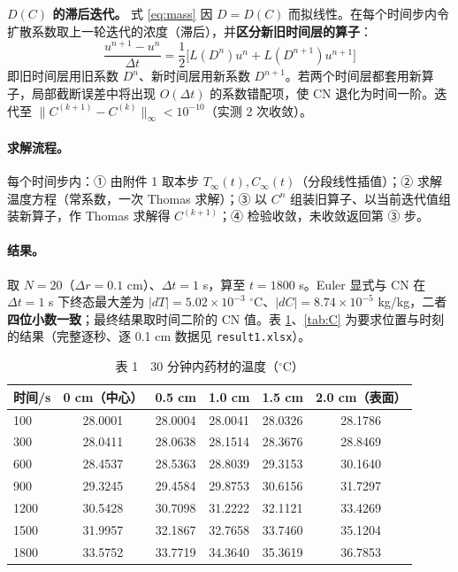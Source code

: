 \documentclass[12pt,a4paper]{ctexart}
\begin{document}
\textbf{$D(C)$ 的滞后迭代。} 式 \eqref{eq:mass} 因 $D=D(C)$ 而拟线性。在每个时间步内令扩散系数取上一轮迭代的浓度（滞后），并\textbf{区分新旧时间层的算子}：
\begin{equation}
\frac{u^{n+1}-u^{n}}{\Delta t}
=\frac12\Big[L(D^n)u^{n}+L(D^{n+1})u^{n+1}\Big]
\label{eq:cn_varc}
\end{equation}
即旧时间层用旧系数 $D^n$、新时间层用新系数 $D^{n+1}$。若两个时间层都套用新算子，局部截断误差中将出现 $O(\Delta t)$ 的系数错配项，使 CN 退化为时间一阶。迭代至 $\|C^{(k+1)}-C^{(k)}\|_\infty<10^{-10}$（实测 2 次收敛）。

\paragraph{求解流程。} 每个时间步内：① 由附件 1 取本步 $T_\infty(t),C_\infty(t)$（分段线性插值）；② 求解温度方程（常系数，一次 Thomas 求解）；③ 以 $C^n$ 组装旧算子、以当前迭代值组装新算子，作 Thomas 求解得 $C^{(k+1)}$；④ 检验收敛，未收敛返回第 ③ 步。

\paragraph{结果。} 取 $N=20$（$\Delta r=0.1$ cm）、$\Delta t=1$ s，算至 $t=1800$ s。Euler 显式与 CN 在 $\Delta t=1$ s 下终态最大差为 $|dT|=5.02\times10^{-3}$ $^\circ$C、$|dC|=8.74\times10^{-5}$ kg/kg，二者\textbf{四位小数一致}；最终结果取时间二阶的 CN 值。表 \ref{tab:T}、\ref{tab:C} 为要求位置与时刻的结果（完整逐秒、逐 0.1 cm 数据见 \texttt{result1.xlsx}）。

\begin{table}[H]
\centering
\caption{表 1　30 分钟内药材的温度（$^\circ$C）}
\label{tab:T}
\begin{tabular}{lccccc}
\toprule
时间/s & 0 cm（中心） & 0.5 cm & 1.0 cm & 1.5 cm & 2.0 cm（表面） \\
\midrule
100  & 28.0001 & 28.0004 & 28.0041 & 28.0326 & 28.1786 \\
300  & 28.0411 & 28.0638 & 28.1514 & 28.3676 & 28.8469 \\
600  & 28.4537 & 28.5363 & 28.8039 & 29.3153 & 30.1640 \\
900  & 29.3245 & 29.4584 & 29.8753 & 30.6156 & 31.7297 \\
1200 & 30.5428 & 30.7098 & 31.2222 & 32.1121 & 33.4269 \\
1500 & 31.9957 & 32.1867 & 32.7658 & 33.7460 & 35.1204 \\
1800 & 33.5752 & 33.7719 & 34.3640 & 35.3619 & 36.7853 \\
\bottomrule
\end{tabular}
\end{table}
\end{document}
